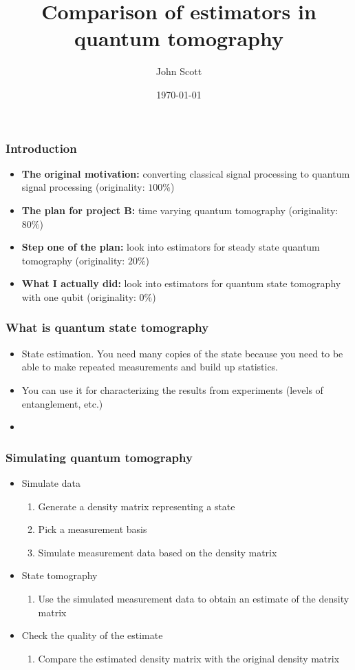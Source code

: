 \documentclass{beamer}
\title{Comparison of estimators in quantum tomography}
\author{John Scott}
\date{\today}
\begin{document}
\begin{frame}
  \titlepage
\end{frame}


\begin{frame}
  \frametitle{Introduction}
  \begin{itemize}
  \item \textbf{The original motivation:} converting classical signal processing to quantum signal processing (originality: $100\%$)
  \item \textbf{The plan for project B:} time varying quantum tomography (originality: $80\%$)
  \item \textbf{Step one of the plan:} look into estimators for steady state quantum tomography (originality: $20\%$)
  \item \textbf{What I actually did:} look into estimators for quantum state tomography with one qubit (originality: $0\%$)
  \end{itemize}
\end{frame}

\begin{frame}
  \frametitle{What is quantum state tomography}
  \begin{itemize}
  \item State estimation. You need many copies of the state because you need to be able to make repeated measurements and build up statistics.
  \item You can use it for characterizing the results from experiments (levels of entanglement, etc.)
  \item 
  \end{itemize}
\end{frame}

\begin{frame}
  \frametitle{Simulating quantum tomography}
  \begin{itemize}
  \item{ Simulate data
      \begin{enumerate}
      \item Generate a density matrix representing a state
      \item Pick a measurement basis
      \item Simulate measurement data based on the density matrix
      \end{enumerate}
    }
  \item{State tomography
      \begin{enumerate}
      \item Use the simulated measurement data to obtain an estimate of the density matrix
      \end{enumerate}
    }
  \item{Check the quality of the estimate
      \begin{enumerate}
      \item Compare the estimated density matrix with the original density matrix
      \end{enumerate}
    }
  \end{itemize}
  \end{frame}
\end{document}
